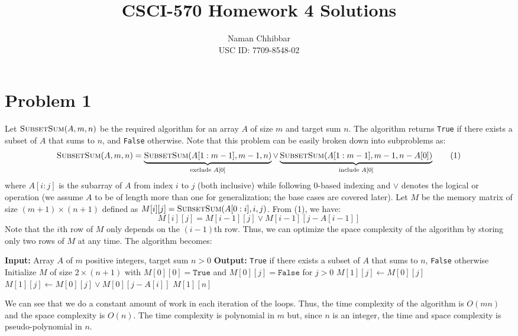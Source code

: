 \documentclass{article}
\title{CSCI-570 Homework 4 Solutions}
\author{
  Naman Chhibbar \\
  USC ID: 7709-8548-02
}
\date{}
\begin{document}
\maketitle

\section{Problem 1}
  Let $\textsc{SubsetSum}(A, m, n)$ be the required algorithm for an array $A$ of size $m$ and target sum $n$.
  The algorithm returns \texttt{True} if there exists a subset of $A$ that sums to $n$, and \texttt{False} otherwise.
  Note that this problem can be easily broken down into subproblems as:
  \[
    \textsc{SubsetSum}(A, m, n) =
    \underbrace{\textsc{SubsetSum}(A[1:m-1], m-1, n)}_{\text{exclude } A[0]}
    \lor \underbrace{\textsc{SubsetSum}(A[1:m-1], m-1, n - A[0])}_{\text{include } A[0]}
    \tag{1}
  \]
  where $A[i:j]$ is the subarray of $A$ from index $i$ to $j$ (both inclusive) while following 0-based indexing and $\lor$ denotes the logical or operation (we assume $A$ to be of length more than one for generalization; the base cases are covered later).
  Let $M$ be the memory matrix of size $(m+1) \times (n+1)$ defined as $M[i][j] = \textsc{SubsetSum}(A[0:i], i, j)$.
  From (1), we have:
  \[ M[i][j] = M[i-1][j] \lor M[i-1][j - A[i-1]] \]
  Note that the $i$th row of $M$ only depends on the $(i-1)$th row.
  Thus, we can optimize the space complexity of the algorithm by storing only two rows of $M$ at any time.
  The algorithm becomes:
  \begin{algorithm}
    \caption{Subset Sum}
    \begin{algorithmic}[1]
      \State \textbf{Input:} Array $A$ of $m$ positive integers, target sum $n > 0$
      \State \textbf{Output:} \texttt{True} if there exists a subset of $A$ that sums to $n$, \texttt {False} otherwise
      \State Initialize $M$ of size $2 \times (n+1)$ with $M[0][0] = \texttt{True}$ and $M[0][j] = \texttt{False}$ for $j > 0$
            \State $M[1][j] \gets M[0][j]$
          \Else
            \State $M[1][j] \gets M[0][j] \lor M[0][j - A[i]]$
          \EndIf
        \EndFor
      \EndFor
      \State \Return $M[1][n]$
    \end{algorithmic}
  \end{algorithm}
  
  We can see that we do a constant amount of work in each iteration of the loops.
  Thus, the time complexity of the algorithm is $O(mn)$ and the space complexity is $O(n)$.
  The time complexity is polynomial in $m$ but, since $n$ is an integer, the time and space complexity is pseudo-polynomial in $n$.
\end{document}
